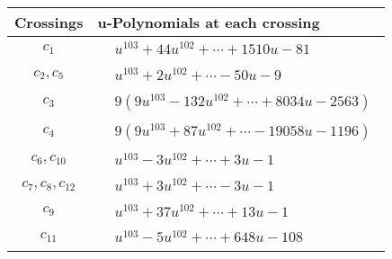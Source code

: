 \documentclass[1p]{elsarticle_modified}
\theoremstyle{definition}
\begin{document}
\begin{tabular}{m{50pt}|m{274pt}}
Crossings & \hspace{64pt}u-Polynomials at each crossing \\
\hline $$\begin{aligned}c_{1}\end{aligned}$$&$\begin{aligned}
&u^{103}+44 u^{102}+\cdots+1510 u-81
\end{aligned}$\\
\hline $$\begin{aligned}c_{2},c_{5}\end{aligned}$$&$\begin{aligned}
&u^{103}+2 u^{102}+\cdots-50 u-9
\end{aligned}$\\
\hline $$\begin{aligned}c_{3}\end{aligned}$$&$\begin{aligned}
&9(9 u^{103}-132 u^{102}+\cdots+8034 u-2563)
\end{aligned}$\\
\hline $$\begin{aligned}c_{4}\end{aligned}$$&$\begin{aligned}
&9(9 u^{103}+87 u^{102}+\cdots-19058 u-1196)
\end{aligned}$\\
\hline $$\begin{aligned}c_{6},c_{10}\end{aligned}$$&$\begin{aligned}
&u^{103}-3 u^{102}+\cdots+3 u-1
\end{aligned}$\\
\hline $$\begin{aligned}c_{7},c_{8},c_{12}\end{aligned}$$&$\begin{aligned}
&u^{103}+3 u^{102}+\cdots-3 u-1
\end{aligned}$\\
\hline $$\begin{aligned}c_{9}\end{aligned}$$&$\begin{aligned}
&u^{103}+37 u^{102}+\cdots+13 u-1
\end{aligned}$\\
\hline $$\begin{aligned}c_{11}\end{aligned}$$&$\begin{aligned}
&u^{103}-5 u^{102}+\cdots+648 u-108
\end{aligned}$\\
\hline
\end{tabular}\\~\\
\end{document}
